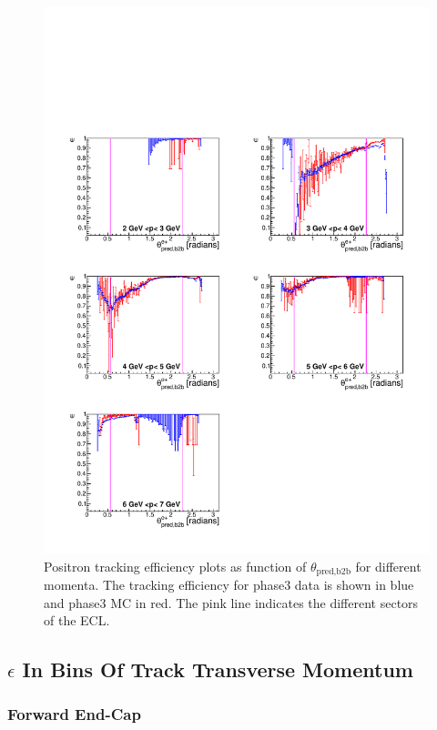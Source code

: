 \documentclass[a4paper,11pt,twosided,final,german,openbib,pdftex,listof=totoc,bibliography=totoc]{scrbook}
\begin{document}
\begin{figure}[!htbp]
	\centering
	\includegraphics[width=\textwidth]{Plots/master3/xPMThetaepP3}
	\caption[Momentum $\theta_{\textrm{pred,b2b}}$ Positron Efficiency Phase3]{Positron tracking efficiency plots as function of $\theta_{\textrm{pred,b2b}}$ for different  momenta. The tracking efficiency for phase3 data is shown in blue and phase3 MC in red. The pink line indicates the different sectors of the ECL.}
	\label{plt:xPMThetaep3}
\end{figure}

\newpage
\subsection{$\epsilon$ In Bins Of Track Transverse Momentum}

\subsubsection{Forward End-Cap}
\end{document}
